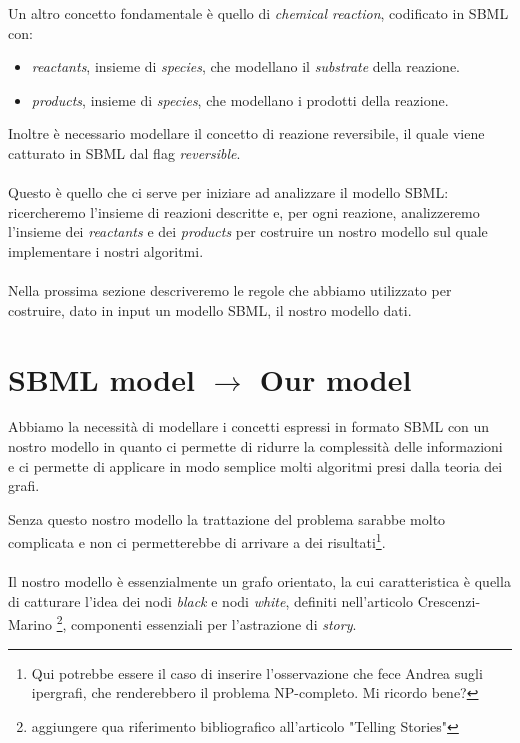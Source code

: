 Un altro concetto fondamentale \`e quello di \emph{chemical reaction},
codificato in SBML con:
\begin{itemize}
\item \emph{reactants}, insieme di \emph{species}, che modellano il
  \emph{substrate} della reazione.
\item \emph{products}, insieme di \emph{species}, che modellano i
  prodotti della reazione.
\end{itemize}
Inoltre \`e necessario modellare il concetto di reazione
reversibile, il quale viene catturato in SBML dal flag
\emph{reversible}.
\\\\
Questo \`e quello che ci serve per iniziare ad analizzare il modello
SBML: ricercheremo l'insieme di reazioni descritte e, per ogni
reazione, analizzeremo l'insieme dei \emph{reactants} e dei
\emph{products} per costruire un nostro modello sul quale implementare
i nostri algoritmi.
\\\\
Nella prossima sezione descriveremo le regole che abbiamo utilizzato
per costruire, dato in input un modello SBML, il nostro modello
dati.

\section{SBML model $\rightarrow$ Our model}

Abbiamo la necessit\`a di modellare i concetti espressi in formato
SBML con un nostro modello in quanto ci permette di ridurre la
complessit\`a delle informazioni e ci permette di applicare in modo
semplice molti algoritmi presi dalla teoria dei grafi.

Senza questo nostro modello la trattazione del problema sarabbe molto
complicata e non ci permetterebbe di arrivare a dei
risultati\footnote{Qui potrebbe essere il caso di inserire
  l'osservazione che fece Andrea sugli ipergrafi, che renderebbero il
  problema NP-completo. Mi ricordo bene?}.
\\\\
Il nostro modello \`e essenzialmente un grafo orientato, la cui
caratteristica \`e quella di catturare l'idea dei nodi \emph{black} e
nodi \emph{white}, definiti nell'articolo Crescenzi-Marino
\footnote{aggiungere qua riferimento bibliografico all'articolo
  "Telling Stories"}, componenti essenziali per l'astrazione di \emph{story}.

